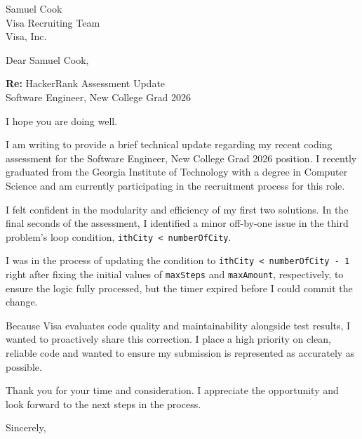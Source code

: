 
\begin{letter}{
Samuel Cook \\
Visa Recruiting Team \\
Visa, Inc.
}

\opening{Dear Samuel Cook,}

\textbf{Re:} HackerRank Assessment Update\\
Software Engineer, New College Grad 2026

I hope you are doing well.

I am writing to provide a brief technical update regarding my recent coding assessment
for the Software Engineer, New College Grad 2026 position. I recently graduated from
the Georgia Institute of Technology with a degree in Computer Science and am currently
participating in the recruitment process for this role.

I felt confident in the modularity and efficiency of my first two solutions.
In the final seconds of the assessment, I identified a minor off-by-one issue
in the third problem's loop condition, \texttt{ithCity < numberOfCity}.

I was in the process of updating the condition to
\texttt{ithCity < numberOfCity - 1} right after fixing the initial values of 
\texttt{maxSteps} and \texttt{maxAmount}, respectively, 
to ensure the logic fully processed, but the timer expired before I could commit the change.

Because Visa evaluates code quality and maintainability alongside test results,
I wanted to proactively share this correction. I place a high priority on clean,
reliable code and wanted to ensure my submission is represented as accurately as possible.

Thank you for your time and consideration. I appreciate the opportunity and look forward
to the next steps in the process.

\closing{Sincerely,}

\end{letter}
